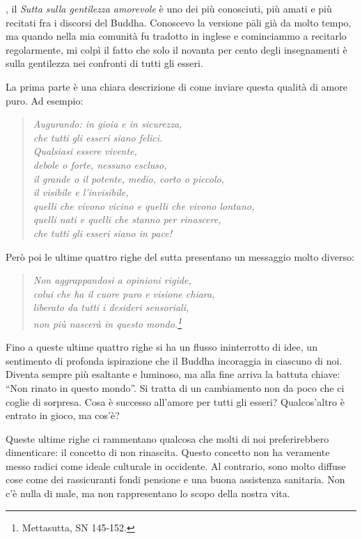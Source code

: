 
, il \textit{Sutta sulla gentilezza amorevole} è uno dei più conosciuti, più amati e più recitati fra i discorsi del Buddha. Conoscevo la versione pāli già da molto tempo, ma quando nella mia comunità fu tradotto in inglese e cominciammo a recitarlo regolarmente, mi colpì il fatto che solo il novanta per cento degli insegnamenti è sulla gentilezza nei confronti di tutti gli esseri.

La prima parte è una chiara descrizione di come inviare questa qualità di amore puro. Ad esempio:

\begin{quote}
\itshape
Augurando: in gioia e in sicurezza, \\
che tutti gli esseri siano felici. \\
Qualsiasi essere vivente, \\
debole o forte, nessuno escluso, \\
il grande o il potente, medio, corto o piccolo, \\
il visibile e l'invisibile, \\
quelli che vivono vicino e quelli che vivono lontano, \\
quelli nati e quelli che stanno per rinascere, \\
che tutti gli esseri siano in pace!
\end{quote}

Però poi le ultime quattro righe del sutta presentano un messaggio molto diverso:

\begin{quote}
\itshape
Non aggrappandosi a opinioni rigide, \\
colui che ha il cuore puro e visione chiara, \\
liberato da tutti i desideri sensoriali, \\
non più nascerà in questo mondo.\footnote{Mettasutta, SN 145-152.}
\end{quote}

Fino a queste ultime quattro righe si ha un flusso ininterrotto di idee, un sentimento di profonda ispirazione che il Buddha incoraggia in ciascuno di noi. Diventa sempre più esaltante e luminoso, ma alla fine arriva la battuta chiave: ``Non rinato in questo mondo''. Si tratta di un cambiamento non da poco che ci coglie di sorpresa. Cosa è successo all'amore per tutti gli esseri? Qualcos'altro è entrato in gioco, ma cos'è?

Queste ultime righe ci rammentano qualcosa che molti di noi preferirebbero dimenticare: il concetto di non rinascita. Questo concetto non ha veramente messo radici come ideale culturale in occidente. Al contrario, sono molto diffuse cose come dei rassicuranti fondi pensione e una buona assistenza sanitaria. Non c'è nulla di male, ma non rappresentano lo scopo della nostra vita.

